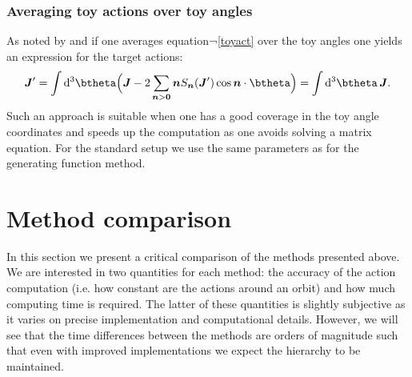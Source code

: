 \documentclass[useAMS,usenatbib,fleqn,a4paper]{mn2e}
\newcommand{\bs}[1]{\bmath{#1}}
\begin{document}
\subsubsection{Averaging toy actions over toy angles}\label{Method::AvGenfunc}
As noted by \cite{Bovy2014} and \cite{Fox2014} if one averages equation¬\eqref{toyact} over the toy angles one yields an expression for the target actions:
\begin{equation}
\bs{J}'=\int\mathrm{d}^3\btheta\Big(\boldsymbol{J}-2\sum_{\bs{n}>\bs{0}}\bs{n}S_{\bs{n}}(\bs{J}')\cos\bs{n}\cdot\btheta\Big)=\int\mathrm{d}^3\btheta\,\boldsymbol{J}.
\end{equation}
 Such an approach is suitable when one has a good coverage in the toy angle coordinates and speeds up the computation as one avoids solving a matrix equation. For the standard setup we use the same parameters as for the generating function method.

\section{Method comparison}\label{Sect::MethodComparison}
In this section we present a critical comparison of the methods presented above. We are interested in two quantities for each method: the accuracy of the action computation (i.e. how constant are the actions around an orbit) and how much computing time is required. The latter of these quantities is slightly subjective as it varies on precise implementation and computational details. However, we will see that the time differences between the methods are orders of magnitude such that even with improved implementations we expect the hierarchy to be maintained.
\end{document}
